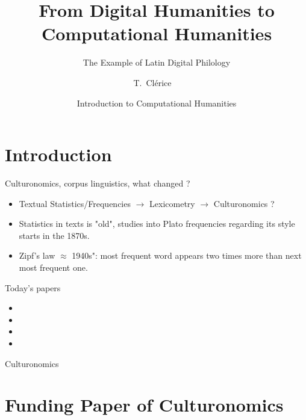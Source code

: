 \documentclass[aspectratio=169]{beamer}
\title[Intro to CH] %
{From Digital Humanities to Computational Humanities}\subtitle{The Example of Latin Digital Philology}
\author[Clérice, Thibault] %
{T.~Clérice~\inst{1}~\inst{2}}
\institute[Inria] %
{
  \inst{1}%
  ALMAnaCH, Inria, Paris, France \and
  \inst{2}%
  FeDHLab, Università Federico II, Napoli, Italia
 }
\date[2024] %
{Introduction to Computational Humanities}
\begin{document}
\frame{\titlepage}


\section{Introduction}

\begin{frame}{Culturonomics, corpus linguistics, what changed ?}
    \begin{itemize}
        \item Textual Statistics/Frequencies $\rightarrow$ Lexicometry $\rightarrow$ Culturonomics ?
        \item Statistics in texts is "old", studies into Plato frequencies regarding its style starts in the 1870s.
        \item Zipf's law $\approx$ 1940s": most frequent word appears two times more than next most frequent one.
    \end{itemize}
\end{frame}

    

\begin{frame}{Today's papers}

    \begin{itemize}
        \item {}
        \item {}
        \item {}
        \item {}
    \end{itemize}
    
\end{frame}

\begin{frame}{Culturonomics}
    
\end{frame}

\section{Funding Paper of Culturonomics}
\end{document}
